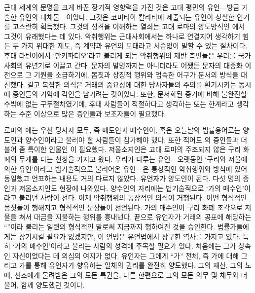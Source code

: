 근대 세계의 문명을 크게 바꾼 장기적 영향력을 가진 것은
고대 평민의 유언---방금 기술한 유언의 대체물---이었다.
그것은 코미티아 칼라타에 제출되는 유언이 상실한 인기를 고스란히 획득했다.
그것의 성격을 이해하는 열쇠는
고대 로마의 양도방식인
에서
그것이
유래했다는 데 있다.
악취행위는 근대사회에서는 하나로 연결지어 생각하기 힘든
두 가지 위대한 제도, 즉 계약과 유언의 모태라고 서슴없이 말할 수 있는 절차이다.
후대 라틴어에서 `만키파티오'라고 불리게 되는
악취행위의 제반 측면들은 우리를 국가사회의 유년기로 이끌고 간다.
문자의 발명까지는 아니더라도 어쨌든 문자의 대중화 이전으로
그 기원을 소급하기에,
몸짓과 상징적 행위와 엄숙한 어구가 문서의 방식을 대신했다.
길고 복잡한 의식은 거래의 중요성에 대한
당사자들의 주의를 환기시키는 동시에 증인들의 기억에 각인을 남기려는 것이었다.
또한, 문서화된 증거에 비해 불완전할 수밖에 없는 구두절차였기에,
후대 사람들이 적절하다고 생각하는 또는 한계라고 생각하는 수준 이상으로 많은
증인들과 보조자들이 필요했다.

로마의 에는 우선 당사자 모두, 즉 매도인과 매수인이,
혹은 오늘날의 법률용어로는 양도인과 양수인이라고 불러야 할 사람들이
참가해야 했다.
또한 적어도 의 증인들과 더불어 좀 특이한 인물인
이 필요했다.
저울소지인은 고대 로마의 주조되지 않은 구리 화폐의 무게를 다는
천칭을 가지고 왔다.
우리가 다루는 유언---오랫동안
%
`구리와 저울에 의한 유언'이라고
법기술적으로 불리어온 유언---은
통상적인 악취행위와 방식에 있어 동일했고
언표하는 내용도 거의 다르지 않았다.
유언자가 양도인이 된다.
다섯 명의 증인과 저울소지인도 현장에 나와있다.
양수인의 자리에는 법기술적으로
%
`가의 매수인'이라고 불리던 사람이 선다.
이제 악취행위의 통상적인 의식이 거행된다.
어떤 형식적인 몸짓들이 행해지고 형식적인 문장들이 선언된다.
가의 매수인이
구리 화폐 조각으로 저울을 쳐서 대금을 지불하는 행위를 흉내낸다.
끝으로 유언자가
거래의 공표에 해당하는 ``''이라
불리는 일련의 형식적인 말로써 지금까지 행하여진 것을 승인한다.
법률가들에게는 상기시킬 필요가 없겠지만, 이 언명은
유언법에서 장구한 역사를 가지고 있다.
특히 `가의 매수인'이라고 불리는 사람의 성격에 주목할 필요가 있다.
처음에는 그가 상속인 자신이었다는 데 의심의 여지가 없다.
유언자는 그에게 ``가'' 전체, 즉
가에 대해 그리고 가를 통해 유언자가 향유하는 일체의 권리를 완전히 양도했다.
그의 재산, 그의 노예, 선조에게 물려받은 그의 모든 특권을,
다른 한편으로 그의 모든 의무 및 채무와 더불어, 함께 양도했던 것이다.

